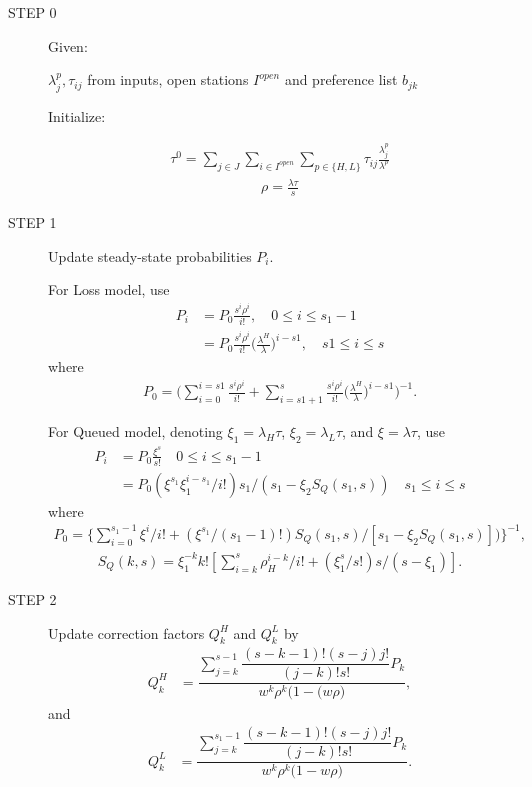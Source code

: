 \documentclass{article}
\begin{document}
\begin{description}
\item[STEP 0]
Given:

$\lambda_j^p, \tau_{ij}$ from inputs, open stations $I^{open}$ and preference list $b_{jk}$

Initialize:

\begin{align}
\tau^0=\sum_{j\in J} \sum_{i \in I^{open}} \sum_{p\in \{H,L\}} \tau_{ij} \frac{\lambda^p_j}{\lambda^p}
\end{align}
\begin{align}
\rho=\frac{\lambda \tau}{s}
\end{align}

\item[STEP 1] Update steady-state probabilities $P_i$.

For Loss model, use
\begin{align}
P_i &= P_0 \frac{s^i\rho^i}{i!}, \quad 0 \leq i \leq s_1-1\\ \nonumber
    &= P_0 \frac{s^i\rho^i}{i!} \big(\frac{\lambda^H}{\lambda}\big)^{i-s1}, \quad s1 \leq i \leq s
\end{align}
where
\begin{align}
P_0 = \big( \sum_{i=0}^{i=s1} \frac{s^i\rho^i}{i!} + \sum_{i=s1+1}^s  \frac{s^i\rho^i}{i!} \big(\frac{\lambda^H}{\lambda}\big)^{i-s1} \big)^{-1}.
\end{align}

For Queued model, denoting $\xi_1=\lambda_H \tau$, $\xi_2=\lambda_L \tau$, and $\xi=\lambda \tau$, use
\begin{align}
P_i & = P_0 \frac{\xi^s}{s!} \quad 0 \leq i \leq s_1-1\\
    & = P_0(\xi^{s_1} \xi_1^{i-s_1}/i!)s_1/(s_1-\xi_2 S_Q(s_1,s))  \quad s_1 \leq i \leq s
\end{align}
where
\begin{align}
P_0 = \{\sum_{i=0}^{s_1-1} \xi^i / i! + (\xi^{s_1}/(s_1-1)!)S_Q(s_1,s)/[s_1-\xi_2 S_Q(s_1,s)])   \}^{-1},
\end{align}
\begin{align}
S_Q(k,s) = \xi_1^{-k}k![\sum_{i=k}^s \rho_H^{i-k}/i!+ (\xi_1^s/s!)s/(s-\xi_1) ].
\end{align}

\item[STEP 2] Update correction factors $Q_k^H$ and $Q_k^L$ by
\begin{align}
 Q_k^H  & = \dfrac{ \sum_{j=k}^{s-1} \dfrac{ (s-k-1)! (s-j) j!}{(j-k)!s!} P_k }
      { w^k \rho^k  \big( 1-(w\rho \big) },
\end{align}
and
\begin{align}
 Q_k^L  & = \dfrac{ \sum_{j=k}^{s_1-1} \dfrac{ (s-k-1)! (s-j) j!}{(j-k)!s!} P_k }
      { w^k \rho^k  \big( 1-w\rho \big) }.
\end{align}


\end{description}
\end{document}
